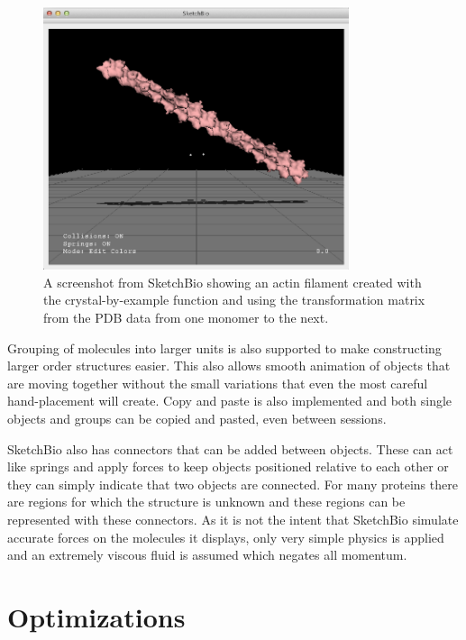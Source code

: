 \documentclass{article} %
\begin{document}
\begin{figure}[h]
\centering
\includegraphics[width=0.8\textwidth]{crystal_actin.png}
\caption{A screenshot from SketchBio showing an actin filament created with the crystal-by-example function and using the transformation matrix from the PDB data from one monomer to the next.}
\label{fig:crystal_actin}
\end{figure}

Grouping of molecules into larger units is also supported to make constructing larger order structures easier.  This also allows smooth animation of objects that are moving together without the small variations that even the most careful hand-placement will create.  Copy and paste is also implemented and both single objects and groups can be copied and pasted, even between sessions.

SketchBio also has connectors that can be added between objects.  These can act like springs and apply forces to keep objects positioned relative to each other or they can simply indicate that two objects are connected.  For many proteins there are regions for which the structure is unknown and these regions can be represented with these connectors.  As it is not the intent that SketchBio simulate accurate forces on the molecules it displays, only very simple physics is applied and an extremely viscous fluid is assumed which negates all momentum.

\section{Optimizations}
\end{document}
